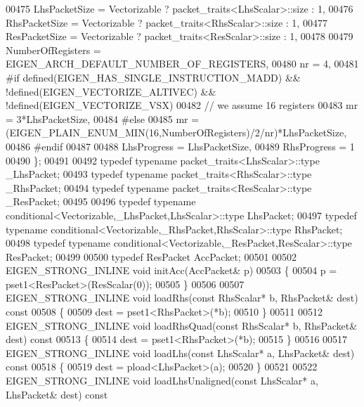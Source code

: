 \begin{DoxyCode}
00475     LhsPacketSize = Vectorizable ? packet\_traits<LhsScalar>::size : 1,
00476     RhsPacketSize = Vectorizable ? packet\_traits<RhsScalar>::size : 1,
00477     ResPacketSize = Vectorizable ? packet\_traits<ResScalar>::size : 1,
00478     
00479     NumberOfRegisters = EIGEN\_ARCH\_DEFAULT\_NUMBER\_OF\_REGISTERS,
00480     nr = 4,
00481 \textcolor{preprocessor}{#if defined(EIGEN\_HAS\_SINGLE\_INSTRUCTION\_MADD) && !defined(EIGEN\_VECTORIZE\_ALTIVEC) &&
       !defined(EIGEN\_VECTORIZE\_VSX)}
00482     \textcolor{comment}{// we assume 16 registers}
00483     mr = 3*LhsPacketSize,
00484 \textcolor{preprocessor}{#else}
00485     mr = (EIGEN\_PLAIN\_ENUM\_MIN(16,NumberOfRegisters)/2/nr)*LhsPacketSize,
00486 #endif
00487 
00488     LhsProgress = LhsPacketSize,
00489     RhsProgress = 1
00490   \};
00491 
00492   \textcolor{keyword}{typedef} \textcolor{keyword}{typename} packet\_traits<LhsScalar>::type  \_LhsPacket;
00493   \textcolor{keyword}{typedef} \textcolor{keyword}{typename} packet\_traits<RhsScalar>::type  \_RhsPacket;
00494   \textcolor{keyword}{typedef} \textcolor{keyword}{typename} packet\_traits<ResScalar>::type  \_ResPacket;
00495 
00496   \textcolor{keyword}{typedef} \textcolor{keyword}{typename} conditional<Vectorizable,\_LhsPacket,LhsScalar>::type LhsPacket;
00497   \textcolor{keyword}{typedef} \textcolor{keyword}{typename} conditional<Vectorizable,\_RhsPacket,RhsScalar>::type RhsPacket;
00498   \textcolor{keyword}{typedef} \textcolor{keyword}{typename} conditional<Vectorizable,\_ResPacket,ResScalar>::type ResPacket;
00499 
00500   \textcolor{keyword}{typedef} ResPacket AccPacket;
00501 
00502   EIGEN\_STRONG\_INLINE \textcolor{keywordtype}{void} initAcc(AccPacket& p)
00503   \{
00504     p = pset1<ResPacket>(ResScalar(0));
00505   \}
00506 
00507   EIGEN\_STRONG\_INLINE \textcolor{keywordtype}{void} loadRhs(\textcolor{keyword}{const} RhsScalar* b, RhsPacket& dest)\textcolor{keyword}{ const}
00508 \textcolor{keyword}{  }\{
00509     dest = pset1<RhsPacket>(*b);
00510   \}
00511   
00512   EIGEN\_STRONG\_INLINE \textcolor{keywordtype}{void} loadRhsQuad(\textcolor{keyword}{const} RhsScalar* b, RhsPacket& dest)\textcolor{keyword}{ const}
00513 \textcolor{keyword}{  }\{
00514     dest = pset1<RhsPacket>(*b);
00515   \}
00516 
00517   EIGEN\_STRONG\_INLINE \textcolor{keywordtype}{void} loadLhs(\textcolor{keyword}{const} LhsScalar* a, LhsPacket& dest)\textcolor{keyword}{ const}
00518 \textcolor{keyword}{  }\{
00519     dest = pload<LhsPacket>(a);
00520   \}
00521 
00522   EIGEN\_STRONG\_INLINE \textcolor{keywordtype}{void} loadLhsUnaligned(\textcolor{keyword}{const} LhsScalar* a, LhsPacket& dest)\textcolor{keyword}{ const}

\end{DoxyCode}
